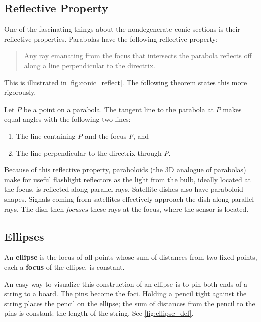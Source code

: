 \subsection*{Reflective Property}

One of the fascinating things about the nondegenerate conic sections is their reflective properties. Parabolas have the following reflective property:

\begin{quote}
	Any ray emanating from the focus that intersects the parabola reflects off along a line perpendicular to the directrix.
\end{quote}

This is illustrated in \autoref{fig:conic_reflect}. The following theorem states this more rigorously.
	
{Let $P$ be a point on a parabola. The tangent line to the parabola at $P$ makes equal angles with the following two lines:
\begin{enumerate}
	\item	The line containing $P$ and the focus $F$, and
	\item	The line perpendicular to the directrix through $P$.
\end{enumerate}}

Because of this reflective property, paraboloids (the 3D analogue of parabolas) make for useful flashlight reflectors as the light from the bulb, ideally located at the focus, is reflected along parallel rays. Satellite dishes also have paraboloid shapes. Signals coming from satellites effectively approach the dish along parallel rays. The dish then \textit{focuses} these rays at the focus, where the sensor is located.

\subsection*{Ellipses}

{An \textbf{ellipse} is the locus of all points whose sum of distances from two fixed points, each a \textbf{focus} of the ellipse, is constant.}

An easy way to visualize this construction of an ellipse is to pin both ends of a string to a board. The pins become the foci. Holding a pencil tight against the string places the pencil on the ellipse; the sum of distances from the pencil to the pins is constant: the length of the string. See \autoref{fig:ellipse_def}.

